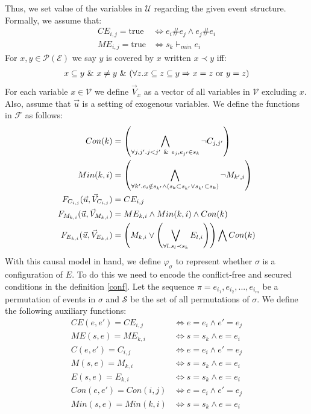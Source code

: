 \documentclass{article}
\begin{document}
Thus, we set value of the variables in $\mathcal{U}$ regarding
the given event structure.
Formally, we assume that:
\begin{align*}
    CE_{i,j} = \text{true} & \iff e_i \# e_j \wedge e_j\# e_i \\
    ME_{i,j} = \text{true} & \iff s_k \vdash_{min} e_i
\end{align*}
For $x,y \in \mathcal{P}(\mathcal{E})$ we say $y$ is covered by $x$ written $ x \prec y$ iff:
\begin{align*}
    x \subseteq y \ \& \  x \neq y \ \& \ 
    (\forall z. x \subseteq z \subseteq y \Rightarrow x = z
    \text{ or } y = z)
\end{align*}
For each variable $x \in \mathcal{V}$ we define $\vec V_x$ as a vector
of all variables in $\mathcal{V}$ excluding $x$.
Also, assume that $\vec u$ is a setting of exogenous variables.
We define the functions in $\mathcal{F}$ as follows:
\begin{align*}
    Con(k)                                & =   \left(
    \bigwedge_{\forall j,j'. j<j' \ \& \  e_j,e_{j'} \in s_k}
    \neg C_{j,j'}
    \right)                                                                          \\
    Min(k,i)                              & = \left(
    \bigwedge_{
        \forall k'. e_i \notin{s_{k'} \wedge \left(
            s_{k} \subset s_{k'} \vee s_{k'} \subset s_{k}
            \right)}
    } \neg M_{k',i}
    \right)                                                                          \\
    F_{C_{i,j}}(\vec u, \vec V_{C_{i,j}}) & = CE_{i,j}                               \\
    F_{M_{k,i}}(\vec u, \vec V_{M_{k,i}}) & = ME_{k,i} \wedge Min(k,i) \wedge Con(k) \\
    F_{E_{k,i}}(\vec u, \vec V_{E_{k,i}}) & =
    \left(
    M_{k,i} \vee
    \left(
    \bigvee_{\forall l. s_l  \prec s_k}E_{l,i}
    \right)
    \right)
    \bigwedge
    Con(k)
\end{align*}
With this causal model in hand, we define $\varphi_{\sigma}$ to represent whether $\sigma$ is a configuration of $E$.
To do this we need to encode the conflict-free and secured conditions in the definition \ref{conf}.
Let the sequence $\pi = e_{i_1},e_{i_2},...,e_{i_m}$ be a
permutation of events in $\sigma$ and $\mathcal{S}$ be the set of
all permutations of $\sigma$.
We define the following auxiliary functions:
\begin{align*}
    CE(e,e') = CE_{i,j}  & \iff e = e_i \wedge e' = e_j \\
    ME(s,e)  = ME_{k,i}  & \iff s = s_k \wedge e = e_i  \\
    C(e,e') = C_{i,j}    & \iff e = e_i \wedge e' = e_j \\
    M(s,e)  = M_{k,i}    & \iff s = s_k \wedge e = e_i  \\
    E(s,e)  = E_{k,i}    & \iff s = s_k \wedge e = e_i  \\
    Con(e,e') = Con(i,j) & \iff e = e_i \wedge e' = e_j \\
    Min(s,e) = Min(k,i)  & \iff  s = s_k \wedge e = e_i \\
\end{align*}
\end{document}
